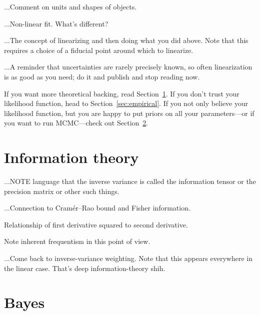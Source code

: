 \documentclass[10pt]{article}
\newcommand{\sectionname}{Section}
\begin{document}
...Comment on units and shapes of objects.

...Non-linear fit. What's different?

...The concept of linearizing and then doing what you did above. Note that this
requires a choice of a fiducial point around which to linearize.

...A reminder that uncertainties are rarely precisely known, so often linearization
is as good as you need; do it and publish and stop reading now.

If you want more theoretical backing, read \sectionname~\ref{sec:info}. If you
don't trust your likelihood function, head to \sectionname~\ref{sec:empirical}.
If you not only believe your likelihood function, but you are happy to put priors
on all your parameters---or if you want to run MCMC---check
out \sectionname~\ref{sec:bayes}.

\section{Information theory}\label{sec:info}

...NOTE language that the inverse variance is called the information tensor or the precision matrix or other such things.

...Connection to Cram\'er--Rao bound and Fisher information.

Relationship of first derivative squared to second derivative.

Note inherent frequentism in this point of view.

...Come back to inverse-variance weighting. Note that this appears everywhere
in the linear case. That's deep information-theory shih.

\section{Bayes}\label{sec:bayes}
\end{document}
